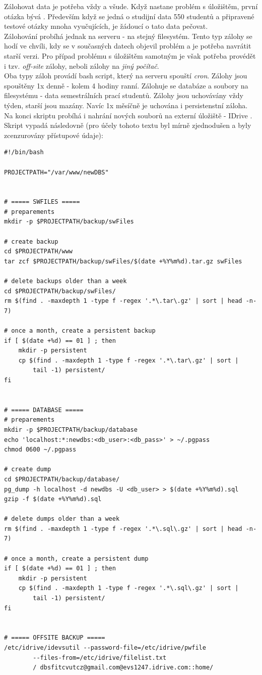 Zálohovat data je potřeba vždy a všude. Když nastane problém s úložištěm, první otázka bývá . Především když se jedná o studijní data 550 studentů a připravené testové otázky mnoha vyučujících, je žádoucí o tato data pečovat.\\
Zálohování probíhá jednak na serveru - na stejný filesystém. Tento typ zálohy se hodí ve chvíli, kdy se v současných datech objevil problém a je potřeba navrátit starší verzi. Pro případ problému s úložištěm samotným je však potřeba provédět i tzv. \emph{off-site} zálohy, neboli zálohy na \emph{jiný počítač}.\\
Oba typy záloh provádí bash script, který na serveru spouští \emph{cron}. Zálohy jsou spouštěny 1x denně - kolem 4 hodiny ranní. Zálohuje se databáze a soubory na filesystému - data semestrálních prací studentů. Zálohy jsou uchovávány vždy týden, starší jsou mazány. Navíc 1x měsíčně je uchována i persistenstní záloha. Na konci skriptu probíhá i nahrání nových souborů na externí úložiště - IDrive \cite{idrive}.\\
Skript vypadá následovně (pro účely tohoto textu byl mírně zjednodušen a byly zcenzurovány přístupové údaje):
\begin{verbatim}
#!/bin/bash

PROJECTPATH="/var/www/newDBS"


# ===== SWFILES =====
# preparements
mkdir -p $PROJECTPATH/backup/swFiles

# create backup
cd $PROJECTPATH/www
tar zcf $PROJECTPATH/backup/swFiles/$(date +%Y%m%d).tar.gz swFiles

# delete backups older than a week
cd $PROJECTPATH/backup/swFiles/
rm $(find . -maxdepth 1 -type f -regex '.*\.tar\.gz' | sort | head -n-7)

# once a month, create a persistent backup
if [ $(date +%d) == 01 ] ; then
    mkdir -p persistent
    cp $(find . -maxdepth 1 -type f -regex '.*\.tar\.gz' | sort |
        tail -1) persistent/
fi


# ===== DATABASE =====
# preparements
mkdir -p $PROJECTPATH/backup/database
echo 'localhost:*:newdbs:<db_user>:<db_pass>' > ~/.pgpass
chmod 0600 ~/.pgpass

# create dump
cd $PROJECTPATH/backup/database/
pg_dump -h localhost -d newdbs -U <db_user> > $(date +%Y%m%d).sql
gzip -f $(date +%Y%m%d).sql

# delete dumps older than a week
rm $(find . -maxdepth 1 -type f -regex '.*\.sql\.gz' | sort | head -n-7)

# once a month, create a persistent dump
if [ $(date +%d) == 01 ] ; then
    mkdir -p persistent
    cp $(find . -maxdepth 1 -type f -regex '.*\.sql\.gz' | sort |
        tail -1) persistent/
fi


# ===== OFFSITE BACKUP =====
/etc/idrive/idevsutil --password-file=/etc/idrive/pwfile
        --files-from=/etc/idrive/filelist.txt
        / dbsfitcvutcz@gmail.com@evs1247.idrive.com::home/

\end{verbatim}
